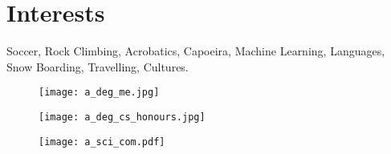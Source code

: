 \documentclass[10pt, a4paper]{report}
\begin{document}
\section*{Interests}
Soccer, Rock Climbing, Acrobatics, Capoeira, Machine Learning, Languages, Snow Boarding, Travelling, Cultures.

%
%
%
%

\pagebreak

\setlength{\topmargin}{-1.5in}
\setlength{\oddsidemargin}{-1in}

\begin{figure}[h!]
   \centering
   \texttt{[image: a\_deg\_me.jpg]} 
\end{figure}

\begin{figure}[h!]
   \centering
   \texttt{[image: a\_deg\_cs\_honours.jpg]} 
\end{figure}

\begin{figure}[h!]
   \centering
   \texttt{[image: a\_sci\_com.pdf]} 
\end{figure}
\end{document}
